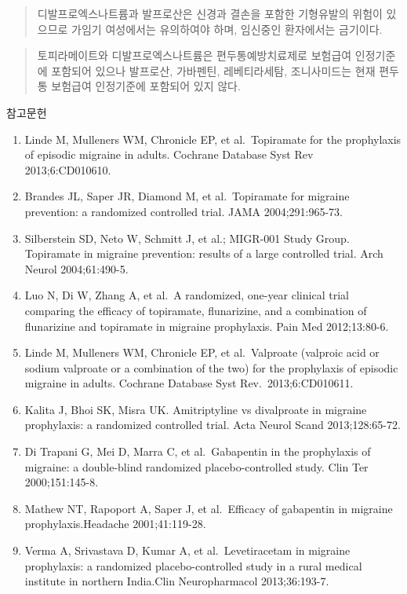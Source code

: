 \documentclass[]{book}
\begin{document}
\begin{quote}
디발프로엑스나트륨과 발프로산은 신경과 결손을 포함한 기형유발의 위험이 있으므로 가임기 여성에서는 유의하여야 하며, 임신중인 환자에서는 금기이다.
\end{quote}

\begin{quote}
토피라메이트와 디발프로엑스나트륨은 편두통예방치료제로 보험급여 인정기준에 포함되어 있으나 발프로산, 가바펜틴, 레베티라세탐, 조니사미드는 현재 편두통 보험급여 인정기준에 포함되어 있지 않다.
\end{quote}

참고문헌

\begin{enumerate}
\def\labelenumi{\arabic{enumi}.}
\item
  Linde M, Mulleners WM, Chronicle EP, et al.~Topiramate for the prophylaxis of episodic migraine in adults. Cochrane Database Syst Rev 2013;6:CD010610.
\item
  Brandes JL, Saper JR, Diamond M, et al.~Topiramate for migraine prevention: a randomized controlled trial. JAMA 2004;291:965-73.
\item
  Silberstein SD, Neto W, Schmitt J, et al.; MIGR-001 Study Group. Topiramate in migraine prevention: results of a large controlled trial. Arch Neurol 2004;61:490-5.
\item
  Luo N, Di W, Zhang A, et al.~A randomized, one-year clinical trial comparing the efficacy of topiramate, flunarizine, and a combination of flunarizine and topiramate in migraine prophylaxis. Pain Med 2012;13:80-6.
\item
  Linde M, Mulleners WM, Chronicle EP, et al.~Valproate (valproic acid or sodium valproate or a combination of the two) for the prophylaxis of episodic migraine in adults. Cochrane Database Syst Rev.~2013;6:CD010611.
\item
  Kalita J, Bhoi SK, Misra UK. Amitriptyline vs divalproate in migraine prophylaxis: a randomized controlled trial. Acta Neurol Scand 2013;128:65-72.
\item
  Di Trapani G, Mei D, Marra C, et al.~Gabapentin in the prophylaxis of migraine: a double-blind randomized placebo-controlled study. Clin Ter 2000;151:145-8.
\item
  Mathew NT, Rapoport A, Saper J, et al.~Efficacy of gabapentin in migraine prophylaxis.Headache 2001;41:119-28.
\item
  Verma A, Srivastava D, Kumar A, et al.~Levetiracetam in migraine prophylaxis: a randomized placebo-controlled study in a rural medical institute in northern India.Clin Neuropharmacol 2013;36:193-7.

\end{enumerate}
\end{document}

